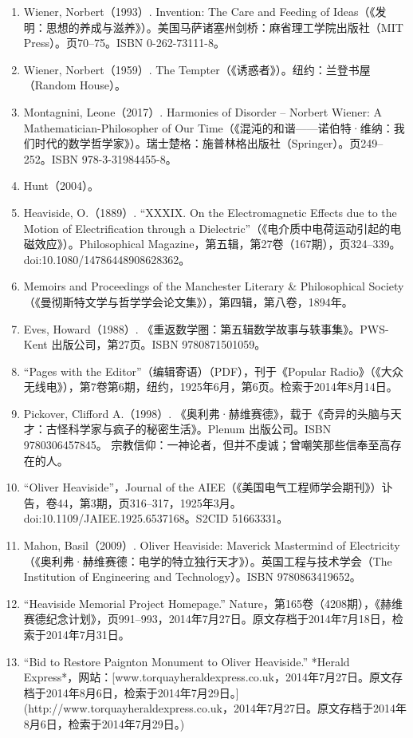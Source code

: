 \begin{enumerate}
\item Wiener, Norbert（1993）. Invention: The Care and Feeding of Ideas（《发明：思想的养成与滋养》）。美国马萨诸塞州剑桥：麻省理工学院出版社（MIT Press）。页70–75。ISBN 0-262-73111-8。
\item Wiener, Norbert（1959）. The Tempter（《诱惑者》）。纽约：兰登书屋（Random House）。
\item Montagnini, Leone（2017）. Harmonies of Disorder – Norbert Wiener: A Mathematician-Philosopher of Our Time（《混沌的和谐——诺伯特·维纳：我们时代的数学哲学家》）。瑞士楚格：施普林格出版社（Springer）。页249–252。ISBN 978-3-31984455-8。
\item Hunt（2004）。
\item Heaviside, O.（1889）. “XXXIX. On the Electromagnetic Effects due to the Motion of Electrification through a Dielectric”（《电介质中电荷运动引起的电磁效应》）。Philosophical Magazine，第五辑，第27卷（167期），页324–339。doi:10.1080/14786448908628362。
\item Memoirs and Proceedings of the Manchester Literary & Philosophical Society（《曼彻斯特文学与哲学学会论文集》），第四辑，第八卷，1894年。
\item Eves, Howard（1988）. 《重返数学圈：第五辑数学故事与轶事集》。PWS-Kent 出版公司，第27页。ISBN 9780871501059。
\item “Pages with the Editor”（编辑寄语）（PDF），刊于《Popular Radio》（《大众无线电》），第7卷第6期，纽约，1925年6月，第6页。检索于2014年8月14日。
\item Pickover, Clifford A.（1998）. 《奥利弗·赫维赛德》，载于《奇异的头脑与天才：古怪科学家与疯子的秘密生活》。Plenum 出版公司。ISBN 9780306457845。
宗教信仰：一神论者，但并不虔诚；曾嘲笑那些信奉至高存在的人。
\item “Oliver Heaviside”，Journal of the AIEE（《美国电气工程师学会期刊》）讣告，卷44，第3期，页316–317，1925年3月。doi:10.1109/JAIEE.1925.6537168。S2CID 51663331。
\item Mahon, Basil（2009）. Oliver Heaviside: Maverick Mastermind of Electricity（《奥利弗·赫维赛德：电学的特立独行天才》）。英国工程与技术学会（The Institution of Engineering and Technology）。ISBN 9780863419652。
\item “Heaviside Memorial Project Homepage.” Nature，第165卷（4208期），《赫维赛德纪念计划》，页991–993，2014年7月27日。原文存档于2014年7月18日，检索于2014年7月31日。
\item “Bid to Restore Paignton Monument to Oliver Heaviside.” *Herald Express*，网站：[www.torquayheraldexpress.co.uk，2014年7月27日。原文存档于2014年8月6日，检索于2014年7月29日。](http://www.torquayheraldexpress.co.uk，2014年7月27日。原文存档于2014年8月6日，检索于2014年7月29日。)

\end{enumerate}
